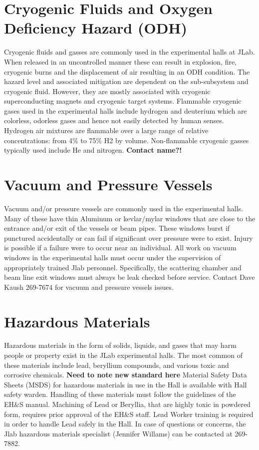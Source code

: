 {{\section{Cryogenic Fluids and Oxygen Deficiency Hazard (ODH)}

	Cryogenic fluids and gasses are commonly used in the experimental halls at JLab. 
When released in an uncontrolled manner these can result in explosion, fire, cryogenic 
burns and the displacement of air resulting in an ODH condition. The hazard level and 
associated mitigation are dependent on the sub-subsystem and cryogenic fluid. However, 
they are mostly associated with cryogenic superconducting magnets and cryogenic target systems. 
Flammable cryogenic gases used in the experimental halls include hydrogen and deuterium which 
are colorless, odorless gases and hence not easily detected by human senses. Hydrogen air 
mixtures are flammable over a large range of relative concentrations: from 4\% to 75\% H2 by volume. 
Non-flammable cryogenic gasses typically used include He and nitrogen. 
{\bf{Contact name?!}}

\section{Vacuum and Pressure Vessels}

	Vacuum and/or pressure vessels are commonly used in the experimental halls. Many 
of these have thin Aluminum or kevlar/mylar windows that are close to the entrance 
and/or exit of the vessels or beam pipes. These windows burst if punctured accidentally 
or can fail if significant over pressure were to exist. Injury is possible if a failure 
were to occur near an individual. All work on vacuum windows in the experimental halls 
must occur under the supervision of appropriately trained Jlab personnel. Specifically, 
the scattering chamber and beam line exit windows must always be leak checked before service. 
Contact Dave Kaush 269-7674 for vacuum and pressure vessels issues.

\section{Hazardous Materials}

	Hazardous materials in the form of solids, liquids, and gases that may harm people 
or property exist in the JLab experimental halls. The most common of these materials include 
lead, beryllium compounds, and various toxic and corrosive chemicals. 
{\bf{Need to note new standard here}} Material Safety Data Sheets (MSDS) for hazardous materials 
in use in the Hall is available with Hall safety warden.  Handling of these materials 
must follow the guidelines of the EH\&S manual. Machining of Lead or Beryllia, that 
are highly toxic in powdered form, requires prior approval of the EH\&S staff. 
Lead Worker training is required in order to handle Lead safely in the Hall. 
In case of questions or concerns, the Jlab hazardous materials specialist (Jennifer Willams) can be contacted at 269-7882.

}}
